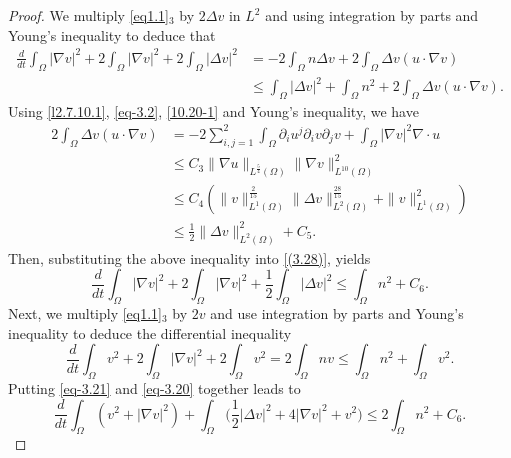 \documentclass[10pt,a4paper]{amsart}
\numberwithin{equation}{section}
\begin{document}
\begin{proof}
We multiply \eqref{eq1.1}$_3$ by $2\Delta v$ in $L^2$ and using integration
 by parts and Young's inequality to deduce that
\begin{equation}\label{(3.28)}
\begin{aligned}
\frac{d}{dt} \int_{\Omega} |\nabla v|^2 
+ 2 \int_{\Omega} |\nabla v|^2 + 2 \int_{\Omega} |\Delta v|^2 
&= - 2 \int_{\Omega} n \Delta v +
2\int_{\Omega} \Delta v (u \cdot \nabla v) \\
&\leq \int_{\Omega} |\Delta v|^2 + \int_{\Omega} n^2 
+ 2\int_{\Omega} \Delta v (u \cdot \nabla v) .
\end{aligned}
\end{equation}
Using \eqref{l2.7.10.1}, \eqref{eq-3.2}, \eqref{10.20-1} and Young's inequality, we have
\begin{equation}\label{eq-3.19}
\begin{aligned}
2\int_{\Omega} \Delta v (u \cdot \nabla v) 
&= -2\sum_{i,j=1}^{2} \int_{\Omega} \partial_i u^j \partial_i v \partial_j v+\int_{\Omega}|\nabla
v|^2\nabla\cdot u\\
&\leq C_3 \|\nabla u\|_{L^{\frac{5}{4}}(\Omega)} \|\nabla v\|_{L^{10}(\Omega)}^2 \\
&\leq C_4\left(\|v\|_{L^1(\Omega)}^{\frac{2}{15}} \|\Delta v\|_{L^2(\Omega)}^{\frac{28}{15}}+\| v\|^2_{L^1(\Omega)}\right) \\
&\leq \frac{1}{2}\|\Delta v\|_{L^2(\Omega)}^2+C_5.
\end{aligned}
\end{equation}
Then, substituting the above inequality into \eqref{(3.28)}, yields
\begin{equation}\label{eq-3.20}
\frac{d}{dt} \int_{\Omega} |\nabla v|^2 + 2 \int_{\Omega} |\nabla v|^2 
+ \frac{1}{2} \int_{\Omega} |\Delta v|^2 \leq \int_{\Omega} n^2+ C_6.
\end{equation}
Next, we multiply \eqref{eq1.1}$_3$ by $2v$ and use integration by parts and 
Young's inequality to deduce the differential inequality
\begin{equation}\label{eq-3.21}
\frac{d}{dt} \int_{\Omega} v^2 + 2\int_{\Omega} |\nabla v|^2
 + 2\int_{\Omega} v^2 = 2\int_{\Omega} nv \leq \int_{\Omega} n^2 + \int_{\Omega} v^2.
\end{equation}
Putting \eqref{eq-3.21} and \eqref{eq-3.20} together leads to
\begin{equation}\label{eq-3.22}
\frac{d}{dt} \int_{\Omega} ( v^2 + |\nabla v|^2 ) 
+ \int_{\Omega}\Big(\frac{1}{2} |\Delta v|^2+4|\nabla v|^2+ v^2\Big) 
\leq 2\int_{\Omega} n^2+ C_6.
\end{equation}


\end{proof}
\end{document}
